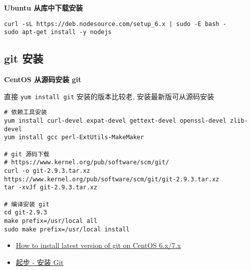\textbf{Ubuntu 从库中下载安装}

\begin{verbatim}
curl -sL https://deb.nodesource.com/setup_6.x | sudo -E bash -
sudo apt-get install -y nodejs
\end{verbatim}

\subsection{git 安装}\label{git-ux5b89ux88c5}

\textbf{CentOS 从源码安装 git}

直接 \texttt{yum\ install\ git} 安装的版本比较老, 安装最新版可从源码安装

\begin{verbatim}
# 依赖工具安装
yum install curl-devel expat-devel gettext-devel openssl-devel zlib-devel
yum install gcc perl-ExtUtils-MakeMaker

# git 源码下载
# https://www.kernel.org/pub/software/scm/git/
curl -o git-2.9.3.tar.xz https://www.kernel.org/pub/software/scm/git/git-2.9.3.tar.xz
tar -xvJf git-2.9.3.tar.xz

# 编译安装 git
cd git-2.9.3
make prefix=/usr/local all
sudo make prefix=/usr/local install
\end{verbatim}

\begin{itemize}
\tightlist
\item
  \href{http://stackoverflow.com/questions/21820715/how-to-install-latest-version-of-git-on-centos-6-x-7-x}{How
  to install latest version of git on CentOS 6.x/7.x}
\item
  \href{https://git-scm.com/book/zh/v1/\%E8\%B5\%B7\%E6\%AD\%A5-\%E5\%AE\%89\%E8\%A3\%85-Git}{起步
  - 安装 Git}
\end{itemize}
